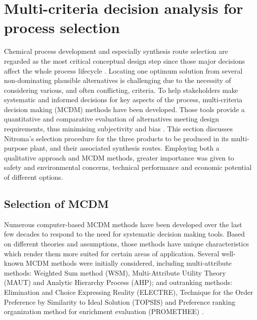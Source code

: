\section{Multi-criteria decision analysis for process selection}

Chemical process development and especially synthesis route selection are regarded as the most critical conceptual design step since those major decisions affect the whole process lifecycle \cite{cziner_evaluative_2005}. Locating one optimum solution from several non-dominating plausible alternatives is challenging due to the necessity of considering various, and often conflicting, criteria. To help stakeholders make systematic and informed decisions for key aspects of the process, multi-criteria decision making (MCDM) methods have been developed. Those tools provide a quantitative and comparative evaluation of alternatives meeting design requirements, thus minimising subjectivity and bias \cite{greco_multiple_2016}. 
This section discusses Nitroma's selection procedure for the three products to be produced in its multi-purpose plant, and their associated synthesis routes. Employing both a qualitative approach and MCDM methods, greater importance was given to safety and environmental concerns, technical performance and economic potential of different options.


\subsection{Selection of MCDM} %

Numerous computer-based MCDM methods have been developed over the last few decades to respond to the need for systematic decision making tools. Based on different theories and assumptions, those methods have unique characteristics which render them more suited for certain areas of application. Several well-known MCDM methods were initially considered, including multi-attribute methods: Weighted Sum method (WSM), Multi-Attribute Utility Theory (MAUT) and Analytic Hierarchy Process (AHP); and outranking methods: Elimination and Choice Expressing Reality (ELECTRE),  Technique for the Order Preference by Similarity to Ideal Solution (TOPSIS) and Preference ranking organization method for enrichment evaluation (PROMETHEE) \cite{hodgett_multi-criteria_2013}. 

